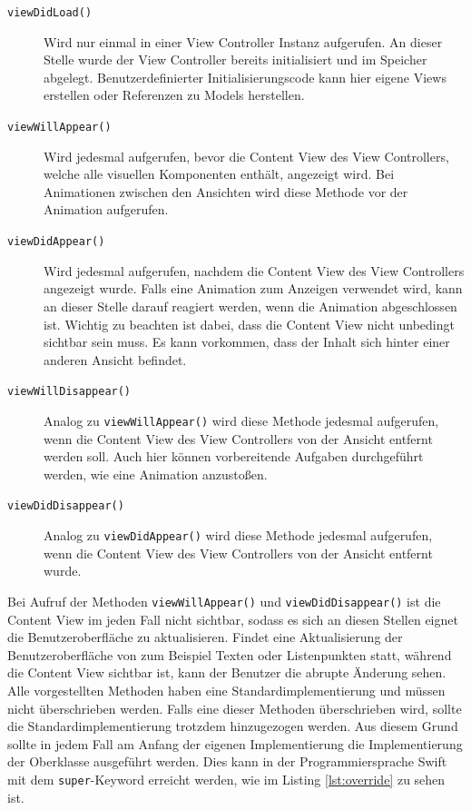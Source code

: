 \begin{description}
\item[\texttt{viewDidLoad()}]
Wird nur einmal in einer View Controller Instanz aufgerufen.
An dieser Stelle wurde der View Controller bereits initialisiert und im Speicher abgelegt.
Benutzerdefinierter Initialisierungscode kann hier eigene Views erstellen oder Referenzen zu Models herstellen.
\item[\texttt{viewWillAppear()}]
Wird jedesmal aufgerufen, bevor die Content View des View Controllers, welche alle visuellen Komponenten enthält, angezeigt wird.
Bei Animationen zwischen den Ansichten wird diese Methode vor der Animation aufgerufen.
\item[\texttt{viewDidAppear()}]
Wird jedesmal aufgerufen, nachdem die Content View des View Controllers angezeigt wurde.
Falls eine Animation zum Anzeigen verwendet wird, kann an dieser Stelle darauf reagiert werden, wenn die Animation abgeschlossen ist.
Wichtig zu beachten ist dabei, dass die Content View nicht unbedingt sichtbar sein muss.
Es kann vorkommen, dass der Inhalt sich hinter einer anderen Ansicht befindet.
\item[\texttt{viewWillDisappear()}]
Analog zu \texttt{viewWillAppear()} wird diese Methode jedesmal aufgerufen, wenn die Content View des View Controllers von der Ansicht entfernt werden soll.
Auch hier können vorbereitende Aufgaben durchgeführt werden, wie eine Animation anzustoßen.
\item[\texttt{viewDidDisappear()}]
Analog zu \texttt{viewDidAppear()} wird diese Methode jedesmal aufgerufen, wenn die Content View des View Controllers von der Ansicht entfernt wurde.
\end{description}
Bei Aufruf der Methoden \texttt{viewWillAppear()} und \texttt{viewDidDisappear()} ist die Content View im jeden Fall nicht sichtbar, sodass es sich an diesen Stellen eignet die Benutzeroberfläche zu aktualisieren.
Findet eine Aktualisierung der Benutzeroberfläche von zum Beispiel Texten oder Listenpunkten statt, während die Content View sichtbar ist, kann der Benutzer die abrupte Änderung sehen.\pbreak%
%
Alle vorgestellten Methoden haben eine Standardimplementierung und müssen nicht überschrieben werden.
Falls eine dieser Methoden überschrieben wird, sollte die Standardimplementierung trotzdem hinzugezogen werden.
Aus diesem Grund sollte in jedem Fall am Anfang der eigenen Implementierung die Implementierung der Oberklasse ausgeführt werden.
Dies kann in der Programmiersprache Swift mit dem \texttt{super}-Keyword erreicht werden, wie im Listing \ref{lst:override} zu sehen ist.\\

